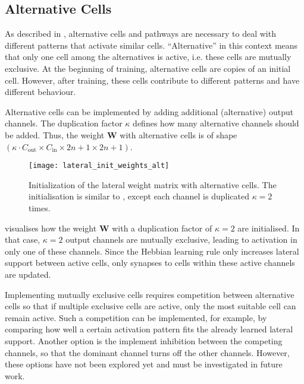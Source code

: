 \subsection{Alternative Cells}
As described in , alternative cells and pathways are necessary to deal with different patterns that activate similar cells.
``Alternative'' in this context means that only one cell among the alternatives is active, i.e. these cells are mutually exclusive.
At the beginning of training, alternative cells are copies of an initial cell.
However, after training, these cells contribute to different patterns and have different behaviour.

Alternative cells can be implemented by adding additional (alternative) output channels.
The duplication factor $\kappa$ defines how many alternative channels should be added.
Thus, the weight $\boldsymbol{W}$ with alternative cells is of shape $(\kappa \cdot C_{\text{out}} \times C_{\text{in}} \times 2n+1 \times 2n+1)$.

\begin{figure}[h]
    \centering
    \texttt{[image: lateral\_init\_weights\_alt]}
    \caption[Initialization of the lateral weight matrix with alternative cells]{Initialization of the lateral weight matrix with alternative cells. The initialisation is similar to , except each channel is duplicated $\kappa=2$ times.}
\end{figure}

 visualises how the weight $\boldsymbol{W}$ with a duplication factor of $\kappa=2$ are initialised.
In that case, $\kappa=2$ output channels are mutually exclusive, leading to activation in only one of these channels.
Since the Hebbian learning rule only increases lateral support between active cells, only synapses to cells within these active channels are updated.

Implementing mutually exclusive cells requires competition between alternative cells so that if multiple exclusive cells are active, only the most suitable cell can remain active.
Such a competition can be implemented, for example, by comparing how well a certain activation pattern fits the already learned lateral support.
Another option is the implement inhibition between the competing channels, so that the dominant channel turns off the other channels.
However, these options have not been explored yet and must be investigated in future work.



